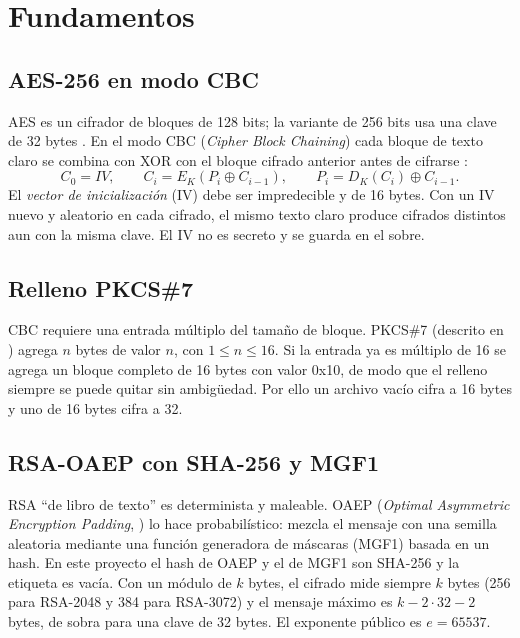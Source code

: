 \documentclass[11pt,a4paper]{article}
\newcommand{\cod}[1]{{\ttfamily\let\_\relax\def\_{\textunderscore\penalty0\hskip0pt\relax}\def\/{\slash\penalty0\hskip0pt\relax}#1}}
\begin{document}
\section{Fundamentos}
\subsection{AES-256 en modo CBC}
AES es un cifrador de bloques de 128 bits; la variante de 256 bits usa una clave de 32 bytes
\cite{fips197}. En el modo CBC (\emph{Cipher Block Chaining}) cada bloque de texto claro se combina con
XOR con el bloque cifrado anterior antes de cifrarse \cite{sp80038a}:
\[
  C_0 = IV,\qquad C_i = E_K(P_i \oplus C_{i-1}),\qquad P_i = D_K(C_i) \oplus C_{i-1}.
\]
El \emph{vector de inicialización} (IV) debe ser impredecible y de 16 bytes. Con un IV nuevo y aleatorio en
cada cifrado, el mismo texto claro produce cifrados distintos aun con la misma clave. El IV no es secreto y se
guarda en el sobre.

\subsection{Relleno PKCS\#7}
CBC requiere una entrada múltiplo del tamaño de bloque. PKCS\#7 (descrito en \cite{rfc5652}) agrega $n$ bytes
de valor $n$, con $1\le n\le 16$. Si la entrada ya es múltiplo de 16 se agrega un bloque completo de 16 bytes
con valor \cod{0x10}, de modo que el relleno siempre se puede quitar sin ambigüedad. Por ello un archivo vacío
cifra a 16 bytes y uno de 16 bytes cifra a 32.

\subsection{RSA-OAEP con SHA-256 y MGF1}
RSA ``de libro de texto'' es determinista y maleable. OAEP (\emph{Optimal Asymmetric Encryption
Padding}, \cite{rfc8017}) lo hace probabilístico: mezcla el mensaje con una semilla aleatoria mediante una
función generadora de máscaras (MGF1) basada en un hash. En este proyecto el hash de OAEP y el de MGF1 son
SHA-256 y la etiqueta es vacía. Con un módulo de $k$ bytes, el cifrado mide siempre $k$ bytes (256 para
RSA-2048 y 384 para RSA-3072) y el mensaje máximo es $k-2\cdot 32-2$ bytes, de sobra para una clave de 32 bytes.
El exponente público es $e=65537$.
\end{document}

